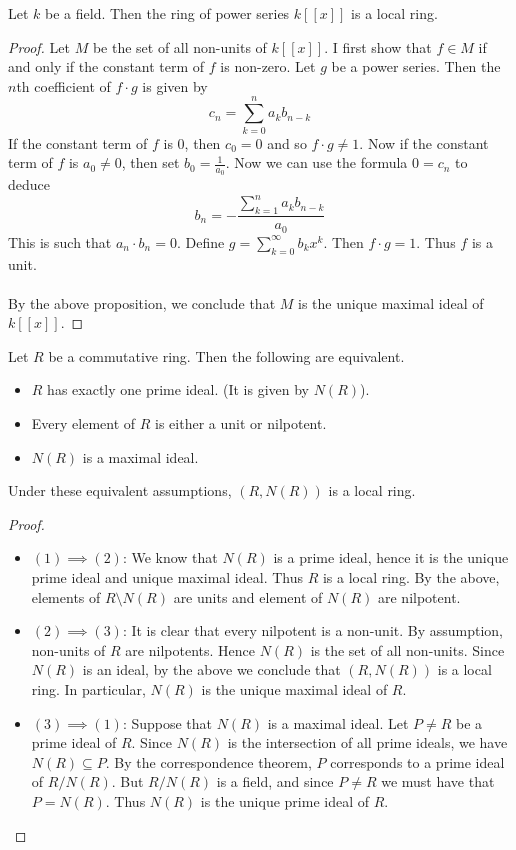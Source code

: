 \documentclass[a4paper]{article}
\begin{document}
\begin{eg}{}{} Let $k$ be a field. Then the ring of power series $k[[x]]$ is a local ring. \tcbline
\begin{proof}
Let $M$ be the set of all non-units of $k[[x]]$. I first show that $f\in M$ if and only if the constant term of $f$ is non-zero. Let $g$ be a power series. Then the $n$th coefficient of $f\cdot g$ is given by $$c_n=\sum_{k=0}^na_kb_{n-k}$$ If the constant term of $f$ is $0$, then $c_0=0$ and so $f\cdot g\neq 1$. Now if the constant term of $f$ is $a_0\neq 0$, then set $b_0=\frac{1}{a_0}$. Now we can use the formula $0=c_n$ to deduce $$b_n=-\frac{\sum_{k=1}^na_kb_{n-k}}{a_0}$$ This is such that $a_n\cdot b_n=0$. Define $g=\sum_{k=0}^\infty b_kx^k$. Then $f\cdot g=1$. Thus $f$ is a unit. \\~\\

By the above proposition, we conclude that $M$ is the unique maximal ideal of $k[[x]]$. 
\end{proof}
\end{eg}

\begin{prp}{}{} Let $R$ be a commutative ring. Then the following are equivalent. 
\begin{itemize}
\item $R$ has exactly one prime ideal. (It is given by $N(R)$).
\item Every element of $R$ is either a unit or nilpotent. 
\item $N(R)$ is a maximal ideal. 
\end{itemize}
Under these equivalent assumptions, $(R,N(R))$ is a local ring. \tcbline
\begin{proof}~\\
\begin{itemize}
\item $(1)\implies(2)$: We know that $N(R)$ is a prime ideal, hence it is the unique prime ideal and unique maximal ideal. Thus $R$ is a local ring. By the above, elements of $R\setminus N(R)$ are units and element of $N(R)$ are nilpotent. 
\item $(2)\implies(3)$: It is clear that every nilpotent is a non-unit. By assumption, non-units of $R$ are nilpotents. Hence $N(R)$ is the set of all non-units. Since $N(R)$ is an ideal, by the above we conclude that $(R,N(R))$ is a local ring. In particular, $N(R)$ is the unique maximal ideal of $R$. 
\item $(3)\implies(1)$: Suppose that $N(R)$ is a maximal ideal. Let $P\neq R$ be a prime ideal of $R$. Since $N(R)$ is the intersection of all prime ideals, we have $N(R)\subseteq P$. By the correspondence theorem, $P$ corresponds to a prime ideal of $R/N(R)$. But $R/N(R)$ is a field, and since $P\neq R$ we must have that $P=N(R)$. Thus $N(R)$ is the unique prime ideal of $R$. 
\end{itemize}
\end{proof}
\end{prp}
\end{document}
